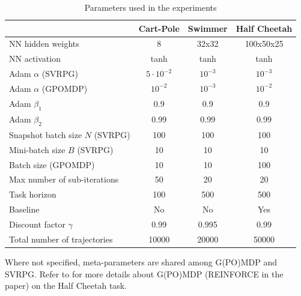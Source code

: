 \begin{table}[H]\caption{Parameters used in the experiments}\label{table:metaparams}
	\centering
	\begin{tabular}{| l | c  c  c |}
		\hline	
		& Cart-Pole & Swimmer & Half Cheetah \\
		\hline
		NN hidden weights & 8 & 32x32 & 100x50x25 \\
		NN activation & tanh & tanh & tanh \\
		Adam $\alpha$ (SVRPG) & $5\cdotp10^{-2}$ & $10^{-3}$ & $10^{-3}$ \\
		Adam $\alpha$ (GPOMDP) & $10^{-2}$ & $10^{-3}$ & $10^{-2}$ \\
		Adam $\beta_1$ & 0.9 & 0.9 & 0.9 \\
		Adam $\beta_2$ & 0.99 & 0.99 & 0.99 \\ 
		Snapshot batch size $N$ (SVRPG) & 100 & 100 & 100 \\
		Mini-batch size $B$ (SVRPG) & 10 & 10 & 10 \\
		Batch size (GPOMDP) & 10 & 10 & 100 \\
		Max number of sub-iterations & 50 & 20 & 20 \\
		Task horizon& 100 & 500 & 500 \\
		Baseline& No & No & Yes \\
		Discount factor $\gamma$& 0.99 & 0.995 & 0.99 \\
		Total number of trajectories& 10000 & 20000 & 50000 \\
		\hline  
	\end{tabular}
\end{table}
Where not specified, meta-parameters are shared among G(PO)MDP and SVRPG.
Refer to \cite{duan2016benchmarking} for more details about G(PO)MDP (REINFORCE in the paper) on the Half Cheetah task.\newpage


